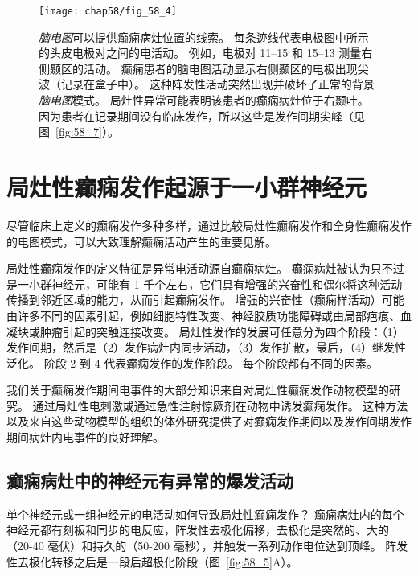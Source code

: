 \begin{figure}[htbp]
	\centering
	\texttt{[image: chap58/fig\_58\_4]}
	\caption{\textit{脑电图}可以提供癫痫病灶位置的线索。
		每条迹线代表电极图中所示的头皮电极对之间的电活动。
		例如，电极对 11–15 和 15–13 测量右侧颞区的活动。
		癫痫患者的脑电图活动显示右侧颞区的电极出现尖波（记录在盒子中）。
		这种阵发性活动突然出现并破坏了正常的背景\textit{脑电图}模式。
		局灶性异常可能表明该患者的癫痫病灶位于右颞叶。
		因为患者在记录期间没有临床发作，所以这些是发作间期尖峰（见图~\ref{fig:58_7}）\cite{lothman1990seizures}。}
	\label{fig:58_4}
\end{figure}



\section{局灶性癫痫发作起源于一小群神经元}

尽管临床上定义的癫痫发作多种多样，通过比较局灶性癫痫发作和全身性癫痫发作的电图模式，可以大致理解癫痫活动产生的重要见解。


局灶性癫痫发作的定义特征是异常电活动源自癫痫病灶。
癫痫病灶被认为只不过是一小群神经元，可能有 1 千个左右，它们具有增强的兴奋性和偶尔将这种活动传播到邻近区域的能力，从而引起癫痫发作。
增强的兴奋性（癫痫样活动）可能由许多不同的因素引起，例如细胞特性改变、神经胶质功能障碍或由局部疤痕、血凝块或肿瘤引起的突触连接改变。
局灶性发作的发展可任意分为四个阶段：（1）发作间期，然后是（2）发作病灶内同步活动，（3）发作扩散，最后，（4）继发性泛化。
阶段 2 到 4 代表癫痫发作的发作阶段。
每个阶段都有不同的因素。


我们关于癫痫发作期间电事件的大部分知识来自对局灶性癫痫发作动物模型的研究。
通过局灶性电刺激或通过急性注射惊厥剂在动物中诱发癫痫发作。
这种方法以及来自这些动物模型的组织的体外研究提供了对癫痫发作期间以及发作间期发作期间病灶内电事件的良好理解。



\subsection{癫痫病灶中的神经元有异常的爆发活动}

单个神经元或一组神经元的电活动如何导致局灶性癫痫发作？
癫痫病灶内的每个神经元都有刻板和同步的电反应，阵发性去极化偏移，去极化是突然的、大的（20-40 毫伏）和持久的（50-200 毫秒），并触发一系列动作电位达到顶峰。
阵发性去极化转移之后是一段后超极化阶段（图~\ref{fig:58_5}A）。


